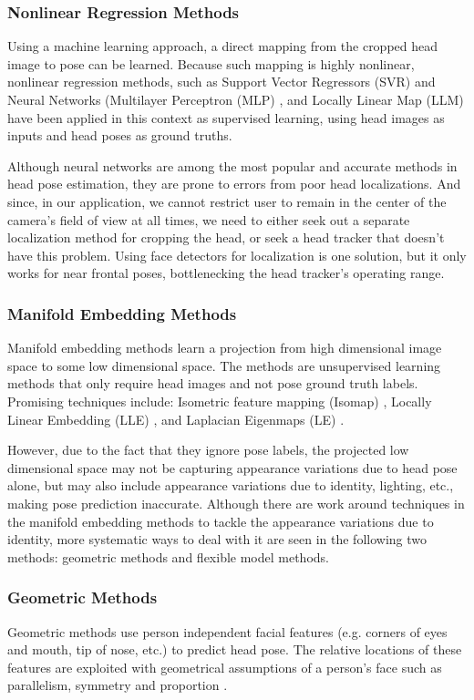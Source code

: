 \subsubsection{Nonlinear Regression Methods}
Using a machine learning approach, a direct mapping from the cropped head image to pose can be learned.  Because such mapping is highly nonlinear, nonlinear regression methods, such as Support Vector Regressors (SVR) \cite{li2000support} and Neural Networks (Multilayer Perceptron (MLP) \cite{voit2008head}, and Locally Linear Map (LLM) \cite{kruger2002gabor} have been applied in this context as supervised learning, using head images as inputs and head poses as ground truths.

Although neural networks are among the most popular and accurate methods in head pose estimation, they are prone to errors from poor head localizations.  And since, in our application, we cannot restrict user to remain in the center of the camera's field of view at all times, we need to either seek out a separate localization method for cropping the head, or seek a head tracker that doesn't have this problem.  Using face detectors for localization is one solution, but it only works for near frontal poses, bottlenecking the head tracker's operating range.


\subsubsection{Manifold Embedding Methods}
Manifold embedding methods learn a projection from high dimensional image space to some low dimensional space.  The methods are unsupervised learning methods that only require head images and not pose ground truth labels.  Promising techniques include: Isometric feature mapping (Isomap) \cite{raytchev2004head}, Locally Linear Embedding (LLE) \cite{roweis2000nonlinear}, and Laplacian Eigenmaps (LE) \cite{belkin2003laplacian}.


However, due to the fact that they ignore pose labels, the projected low dimensional space may not be capturing appearance variations due to head pose alone, but may also include appearance variations due to identity, lighting, etc., making pose prediction inaccurate.  Although there are work around techniques in the manifold embedding methods to tackle the appearance variations due to identity, more systematic ways to deal with it are seen in the following two methods: geometric methods and flexible model methods.


\subsubsection{Geometric Methods}
Geometric methods use person independent facial features (e.g. corners of eyes and mouth, tip of nose, etc.) to predict head pose.  The relative locations of these features are exploited with geometrical assumptions of a person's face such as parallelism, symmetry and proportion \cite{wang2007enhancement}.


